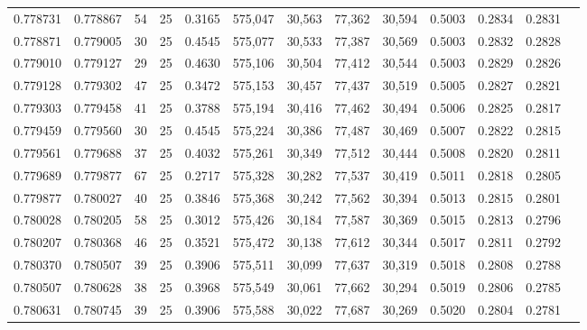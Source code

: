 \begin{tabular}{rrrrrrrrrrrrr}
0.778731 & 0.778867 &    54 &  25 &                                     0.3165 & 575,047 &  30,563 &  77,362 &  30,594 & 0.5003 & 0.2834 & 0.2831 \\
0.778871 & 0.779005 &    30 &  25 &                                     0.4545 & 575,077 &  30,533 &  77,387 &  30,569 & 0.5003 & 0.2832 & 0.2828 \\
0.779010 & 0.779127 &    29 &  25 &                                     0.4630 & 575,106 &  30,504 &  77,412 &  30,544 & 0.5003 & 0.2829 & 0.2826 \\
0.779128 & 0.779302 &    47 &  25 &                                     0.3472 & 575,153 &  30,457 &  77,437 &  30,519 & 0.5005 & 0.2827 & 0.2821 \\
0.779303 & 0.779458 &    41 &  25 &                                     0.3788 & 575,194 &  30,416 &  77,462 &  30,494 & 0.5006 & 0.2825 & 0.2817 \\
0.779459 & 0.779560 &    30 &  25 &                                     0.4545 & 575,224 &  30,386 &  77,487 &  30,469 & 0.5007 & 0.2822 & 0.2815 \\
0.779561 & 0.779688 &    37 &  25 &                                     0.4032 & 575,261 &  30,349 &  77,512 &  30,444 & 0.5008 & 0.2820 & 0.2811 \\
0.779689 & 0.779877 &    67 &  25 &                                     0.2717 & 575,328 &  30,282 &  77,537 &  30,419 & 0.5011 & 0.2818 & 0.2805 \\
0.779877 & 0.780027 &    40 &  25 &                                     0.3846 & 575,368 &  30,242 &  77,562 &  30,394 & 0.5013 & 0.2815 & 0.2801 \\
0.780028 & 0.780205 &    58 &  25 &                                     0.3012 & 575,426 &  30,184 &  77,587 &  30,369 & 0.5015 & 0.2813 & 0.2796 \\
0.780207 & 0.780368 &    46 &  25 &                                     0.3521 & 575,472 &  30,138 &  77,612 &  30,344 & 0.5017 & 0.2811 & 0.2792 \\
0.780370 & 0.780507 &    39 &  25 &                                     0.3906 & 575,511 &  30,099 &  77,637 &  30,319 & 0.5018 & 0.2808 & 0.2788 \\
0.780507 & 0.780628 &    38 &  25 &                                     0.3968 & 575,549 &  30,061 &  77,662 &  30,294 & 0.5019 & 0.2806 & 0.2785 \\
0.780631 & 0.780745 &    39 &  25 &                                     0.3906 & 575,588 &  30,022 &  77,687 &  30,269 & 0.5020 & 0.2804 & 0.2781 \\

\end{tabular}
